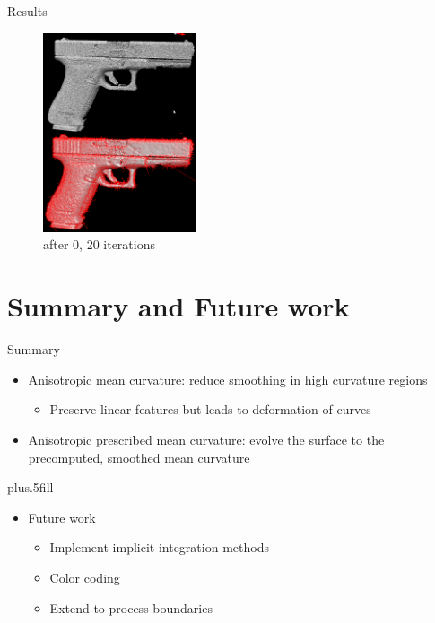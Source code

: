 \documentclass{beamer}
\begin{document}
\begin{frame}{Results}
\begin{figure}[htb]
\centering
\includegraphics[width=0.4\textwidth]{gun_raw_20it.PNG}
\caption{after 0, 20 iterations}
\label{fig:prescribed}
\end{figure}
\end{frame}

\section{Summary and Future work}

\begin{frame}{Summary}
  \begin{itemize}
  \item
    Anisotropic mean curvature: reduce smoothing in high curvature regions
    \begin{itemize}
    \item Preserve linear features but leads to deformation of curves
    \end{itemize}
  \item
    Anisotropic prescribed mean curvature: evolve the surface to the precomputed, smoothed mean curvature
  \end{itemize}
  \vskip0pt plus.5fill
  \begin{itemize}
  \item
    Future work
    \begin{itemize}
    \item Implement implicit integration methods
    \item Color coding
    \item Extend to process boundaries
    \end{itemize}
  \end{itemize}
\end{frame}
\end{document}
